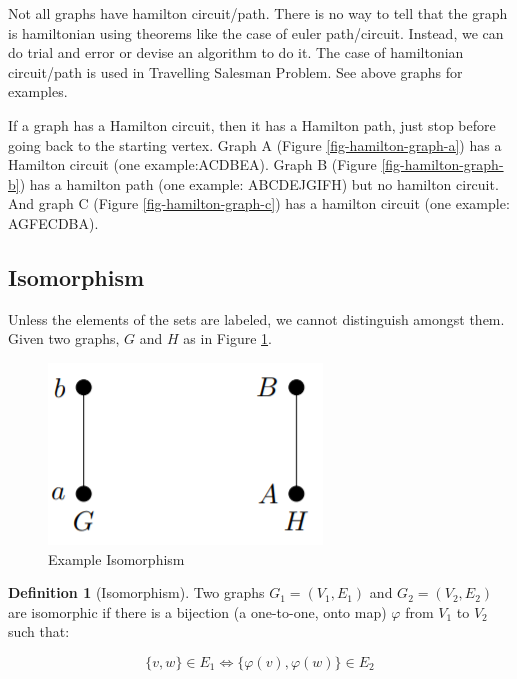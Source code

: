 \documentclass{article}
\theoremstyle{plain}%
\theoremstyle{definition}
\newtheorem{defn}{Definition}[section]
\theoremstyle{remark}
\begin{document}
	Not all graphs have hamilton circuit/path. There is no way to tell that the graph is hamiltonian using theorems like the case of euler path/circuit. Instead, we can do trial and error or devise an algorithm to do it. The case of hamiltonian circuit/path is used in Travelling Salesman Problem. See above graphs for examples.

	If a graph has a Hamilton circuit, then it has a Hamilton path, just stop before going back to the starting vertex. Graph A (Figure \ref{fig-hamilton-graph-a}) has a Hamilton circuit (one example:ACDBEA). Graph B (Figure \ref{fig-hamilton-graph-b}) has a hamilton path (one example: ABCDEJGIFH) but no hamilton circuit. And graph C (Figure \ref{fig-hamilton-graph-c}) has a hamilton circuit (one example: AGFECDBA).

	\subsection{Isomorphism}

	Unless the elements of the sets are labeled, we cannot distinguish amongst them. Given two graphs, $G$ and $H$ as in Figure \ref{fig-ex-isomorphism}.

	\begin{figure}[htbp]
		\center
		\includegraphics[scale=0.4]{img/isomorph-a.png}
		\caption{Example Isomorphism}
		\label{fig-ex-isomorphism}
	\end{figure}

	\begin{defn}[Isomorphism]
		Two graphs $G_1 = (V_1, E_1)$ and $G_2 = (V_2, E_2)$ are isomorphic if there is a bijection (a one-to-one, onto map) $\varphi$ from $V_1$ to $V_2$ such that:

		\begin{equation}\label{eq-isomorphism}
			\{v,w\} \in E_1 \Leftrightarrow \{\varphi(v),\varphi(w) \} \in E_2
		\end{equation}
	\end{defn}
\end{document}
